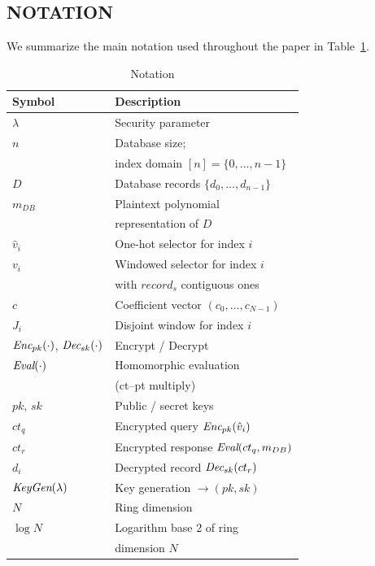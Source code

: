 \documentclass[letterpaper,journal]{IEEEtran}
\begin{document}
\subsection{NOTATION}
We summarize the main notation used throughout the paper in Table~\ref{tab:notation}.

\begin{table}[!htbp]
\caption{Notation}
\label{tab:notation}
\setlength{\tabcolsep}{6pt}
\renewcommand{\arraystretch}{1.1}
    \begin{tabular}{|l|l|}
    \hline
    \textbf{Symbol} & \textbf{Description} \\
    \hline
    $\lambda$ & Security parameter \\
    \hline
    $n$ & Database size; \\ & index domain $[n]=\{0,\dots,n-1\}$ \\
    \hline
    $D$ & Database records $\{d_0,\dots,d_{n-1}\}$ \\
    \hline
    \emph{$m_{DB}$} & Plaintext polynomial \\ & representation of $D$ \\
    \hline
    $\hat{v}_i$ & One-hot selector for index $i$ \\
    \hline
    ${v}_i$ & Windowed selector for index $i$ \\ & with $record_s$ contiguous ones \\
    \hline
    ${c}$ & Coefficient vector $(c_0,\dots,c_{N-1})$ \\
    \hline
    $J_i$ & Disjoint window for index $i$ \\ 
    \hline
    $\emph{Enc}_{pk}(\cdot)$, $\emph{Dec}_{sk}(\cdot)$ & Encrypt / Decrypt \\
    \hline
    $\emph{Eval}(\cdot)$ & Homomorphic evaluation \\ & (ct–pt multiply) \\
    \hline
    $pk,\, sk$ & Public / secret keys \\
    \hline
    $ct_q$ & Encrypted query $\emph{Enc}_{pk}(\hat{v}_i)$ \\
    \hline
    $ct_r$ & Encrypted response $\emph{Eval}(ct_q, \emph{$m_{DB}$})$ \\
    \hline
    $d_i$ & Decrypted record $\emph{Dec}_{sk}(ct_r)$  \\
    \hline
    $\emph{KeyGen}(\lambda)$ & Key generation $\!\to\!(pk,sk)$ \\
    \hline
    $N$ & Ring dimension \\
    \hline
    $\log N$ & Logarithm base 2 of ring \\ & dimension $N$ \\

\end{tabular}
\end{table}
\end{document}
